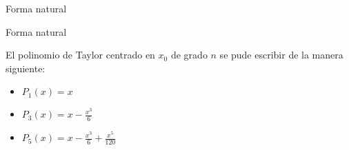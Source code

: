\begin{frame}{Forma natural}
  \begin{block}{Forma natural}

    El polinomio de Taylor centrado en $x_0$ de grado $n$ se pude 
    escribir de la manera siguiente:
      
    \begin{center}
    \end{center}
  \end{block}

  \begin{multicols}{2}
    
  \columnbreak
  \begin{itemize}
    \item $P_1(x) = x$
    \item $P_3(x) = x-\frac{x^3}{6}$
    \item $P_5(x) = x - \frac{x^3}{6} + \frac{x^5}{120}$
  \end{itemize}
\end{multicols}
        

\end{frame}
